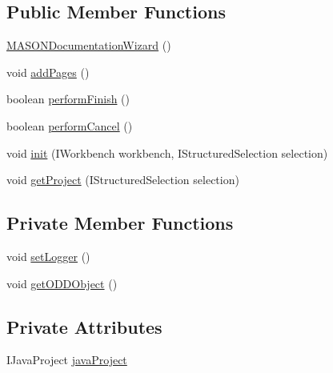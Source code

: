 \subsection*{Public Member Functions}
\begin{DoxyCompactItemize}
\item 
\hyperlink{classit_1_1isislab_1_1masonassisteddocumentation_1_1mason_1_1wizards_1_1_m_a_s_o_n_documentation_wizard_a0138224aaaeee3d68f87a0c631fdc93a}{M\-A\-S\-O\-N\-Documentation\-Wizard} ()
\item 
void \hyperlink{classit_1_1isislab_1_1masonassisteddocumentation_1_1mason_1_1wizards_1_1_m_a_s_o_n_documentation_wizard_a66cbb6f22b37005f8ad31a5357805c9b}{add\-Pages} ()
\item 
boolean \hyperlink{classit_1_1isislab_1_1masonassisteddocumentation_1_1mason_1_1wizards_1_1_m_a_s_o_n_documentation_wizard_a21f0797b8d343d9616c5dd6176d80ab3}{perform\-Finish} ()
\item 
boolean \hyperlink{classit_1_1isislab_1_1masonassisteddocumentation_1_1mason_1_1wizards_1_1_m_a_s_o_n_documentation_wizard_a3d13090b752381e39330d235e630ba45}{perform\-Cancel} ()
\item 
void \hyperlink{classit_1_1isislab_1_1masonassisteddocumentation_1_1mason_1_1wizards_1_1_m_a_s_o_n_documentation_wizard_a2ab8eeb7cdbda4a2da587eb5212d68a9}{init} (I\-Workbench workbench, I\-Structured\-Selection selection)
\item 
void \hyperlink{classit_1_1isislab_1_1masonassisteddocumentation_1_1mason_1_1wizards_1_1_m_a_s_o_n_documentation_wizard_ae51cfd5f549a5ad5758567f5d40621b7}{get\-Project} (I\-Structured\-Selection selection)
\end{DoxyCompactItemize}
\subsection*{Private Member Functions}
\begin{DoxyCompactItemize}
\item 
void \hyperlink{classit_1_1isislab_1_1masonassisteddocumentation_1_1mason_1_1wizards_1_1_m_a_s_o_n_documentation_wizard_a82d1898a0c9e9c4ae83e19bf1f024238}{set\-Logger} ()
\item 
void \hyperlink{classit_1_1isislab_1_1masonassisteddocumentation_1_1mason_1_1wizards_1_1_m_a_s_o_n_documentation_wizard_aca916d42cfefb4c50563b3f9c4b1a969}{get\-O\-D\-D\-Object} ()
\end{DoxyCompactItemize}
\subsection*{Private Attributes}
\begin{DoxyCompactItemize}
\item 
I\-Java\-Project \hyperlink{classit_1_1isislab_1_1masonassisteddocumentation_1_1mason_1_1wizards_1_1_m_a_s_o_n_documentation_wizard_a19679a26a6394a719262167ac2c7d0c2}{java\-Project}
\end{DoxyCompactItemize}
